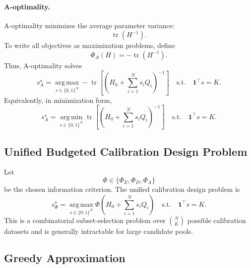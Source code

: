 \documentclass[letterpaper, 9
 pt, conference]{ieeeconf}
\begin{document}
\paragraph{A-optimality.}
A-optimality minimizes the average parameter variance:
\begin{equation}
    \operatorname{tr}(H^{-1}).
\end{equation}
To write all objectives as maximization problems, define
\begin{equation}
    \Phi_A(H)
    =
    -
    \operatorname{tr}(H^{-1}).
\end{equation}
Thus, A-optimality solves
\begin{equation}
    s_A^\star
    =
    \operatorname*{arg\,max}_{s\in\{0,1\}^{N}}
    -
    \operatorname{tr}
    \left[
    \left(
    H_0+\sum_{i=1}^{N}s_iQ_i
    \right)^{-1}
    \right]
    \quad
    \text{s.t.}
    \quad
    \mathbf{1}^{\top}s=K.
\end{equation}
Equivalently, in minimization form,
\begin{equation}
    s_A^\star
    =
    \operatorname*{arg\,min}_{s\in\{0,1\}^{N}}
    \operatorname{tr}
    \left[
    \left(
    H_0+\sum_{i=1}^{N}s_iQ_i
    \right)^{-1}
    \right]
    \quad
    \text{s.t.}
    \quad
    \mathbf{1}^{\top}s=K.
\end{equation}

\subsection{Unified Budgeted Calibration Design Problem}
\label{subsec:unified_design_problem}

Let
\begin{equation}
    \Phi\in\{\Phi_E,\Phi_D,\Phi_A\}
\end{equation}
be the chosen information criterion. The unified calibration design problem is
\begin{equation}
\boxed{
    s_\Phi^\star
    =
    \operatorname*{arg\,max}_{s\in\{0,1\}^{N}}
    \Phi
    \left(
    H_0+\sum_{i=1}^{N}s_iQ_i
    \right)
    \quad
    \text{s.t.}
    \quad
    \mathbf{1}^{\top}s=K.
}
\end{equation}
This is a combinatorial subset-selection problem over $\binom{N}{K}$ possible calibration datasets and is generally intractable for large candidate pools.

\subsection{Greedy Approximation}
\label{subsec:greedy_selection}
\end{document}
